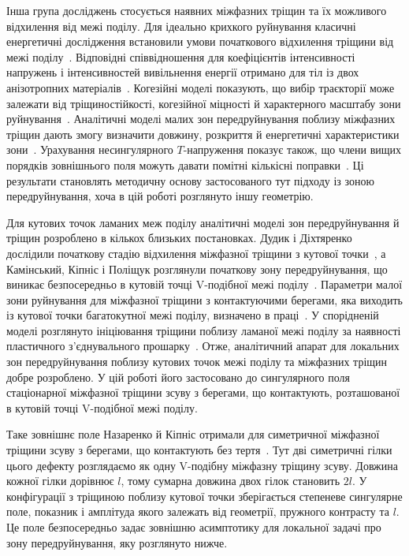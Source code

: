 Інша група досліджень стосується наявних міжфазних тріщин та їх можливого відхилення від межі поділу. Для ідеально крихкого руйнування класичні енергетичні дослідження встановили умови початкового відхилення тріщини від межі поділу~\citep{HeHutchinson1989}. Відповідні співвідношення для коефіцієнтів інтенсивності напружень і інтенсивностей вивільнення енергії отримано для тіл із двох анізотропних матеріалів~\citep{Wang1994}. Когезійні моделі показують, що вибір траєкторії може залежати від тріщиностійкості, когезійної міцності й характерного масштабу зони руйнування~\citep{ParmigianiThouless2006}. Аналітичні моделі малих зон передруйнування поблизу міжфазних тріщин дають змогу визначити довжину, розкриття й енергетичні характеристики зони~\citep{KaminskyEtAl2023}. Урахування несингулярного $T$-напруження показує також, що члени вищих порядків зовнішнього поля можуть давати помітні кількісні поправки~\citep{KaminskyDudykChornoivan2026}. Ці результати становлять методичну основу застосованого тут підходу із зоною передруйнування, хоча в цій роботі розглянуто іншу геометрію.

Для кутових точок ламаних меж поділу аналітичні моделі зон передруйнування й тріщин розроблено в кількох близьких постановках. Дудик і Діхтяренко дослідили початкову стадію відхилення міжфазної тріщини з кутової точки~\citeyearpar{DudykDikhtyarenko2012}, а Камінський, Кіпніс і Поліщук розглянули початкову зону передруйнування, що виникає безпосередньо в кутовій точці V-подібної межі поділу~\citeyearpar{KaminskyKipnisPolishchuk2012}. Параметри малої зони руйнування для міжфазної тріщини з контактуючими берегами, яка виходить із кутової точки багатокутної межі поділу, визначено в праці~\citep{KaminskyDudykFenkiv2023}. У спорідненій моделі розглянуто ініціювання тріщини поблизу ламаної межі поділу за наявності пластичного з’єднувального прошарку~\citep{KaminskyDudykPolishchuk2024}. Отже, аналітичний апарат для локальних зон передруйнування поблизу кутових точок межі поділу та міжфазних тріщин добре розроблено. У цій роботі його застосовано до сингулярного поля стаціонарної міжфазної тріщини зсуву з берегами, що контактують, розташованої в кутовій точці V-подібної межі поділу.

Таке зовнішнє поле Назаренко й Кіпніс отримали для симетричної міжфазної тріщини зсуву з берегами, що контактують без тертя~\citep{NazarenkoKipnis2022Stress}. Тут дві симетричні гілки цього дефекту розглядаємо як одну V-подібну міжфазну тріщину зсуву. Довжина кожної гілки дорівнює $l$, тому сумарна довжина двох гілок становить $2l$. У конфігурації з тріщиною поблизу кутової точки зберігається степеневе сингулярне поле, показник і амплітуда якого залежать від геометрії, пружного контрасту та $l$. Це поле безпосередньо задає зовнішню асимптотику для локальної задачі про зону передруйнування, яку розглянуто нижче.

